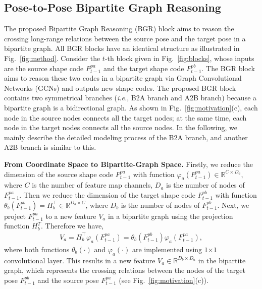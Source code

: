 \documentclass{bmvc2k}
\begin{document}
\subsection{Pose-to-Pose Bipartite Graph Reasoning}
The proposed Bipartite Graph Reasoning (BGR) block aims to reason the crossing long-range relations between the source pose and the target pose in a bipartite graph.
All BGR blocks have an identical structure as illustrated in Fig.~\ref{fig:method}. 
Consider the $t$-th block given in Fig.~\ref{fig:blocks}, whose inputs are the source shape code $F_{t-1}^{pa}$ and the target shape code $F_{t-1}^{pb}$.
The BGR block aims to reason these two codes in a bipartite graph via Graph Convolutional Networks (GCNs) and outputs new shape codes.
The proposed BGR block contains two symmetrical branches (\emph{i.e.}, B2A branch and A2B branch) because a bipartite graph is a bidirectional graph. As shown in Fig.~\ref{fig:motivation}(c), each node in the source nodes connects all the target nodes; at the same time, each node in the target nodes connects all the source nodes.
In the following, we mainly describe the detailed modeling process of the B2A branch, and another A2B branch is similar to this.

\noindent \textbf{From Coordinate Space to Bipartite-Graph Space.}
Firstly, we reduce the dimension of the source shape code $F_{t-1}^{pa}$ with function $\varphi_a(F_{t-1}^{pa}) {\in} \mathbb{R}^{C \times D_a}$, where $C$ is the number of feature map channels, $D_a$ is the number of nodes of $F_{t-1}^{pa}$.
Then we reduce the dimension of the target shape code $F_{t-1}^{pb}$ with function $\theta_b(F_{t-1}^{pb}) {=} H_b^\intercal {\in} \mathbb{R}^{D_b  \times C}$, where $D_b$ is the number of nodes of $F_{t-1}^{pb}$.
Next, we project $F_{t-1}^{pa}$ to a new feature $V_a$ in a bipartite graph using the projection function $H_b^T$. 
Therefore we have,
\begin{equation}
\begin{aligned}
V_a = H_b^\intercal \varphi_a(F_{t-1}^{pa}) = \theta_b(F_{t-1}^{pb}) \varphi_a(F_{t-1}^{pa}),
\end{aligned}
\end{equation}
where both functions $\theta_b(\cdot)$ and $\varphi_a(\cdot)$ are implemented using $1{\times1}$ convolutional layer. 
This results in a new feature $V_a {\in} \mathbb{R}^{D_b \times D_a}$ in the bipartite graph, which represents the crossing relations between the nodes of the target pose $F_{t-1}^{pb}$ and the source pose $F_{t-1}^{pa}$ (see Fig.~\ref{fig:motivation}(c)).
\end{document}
